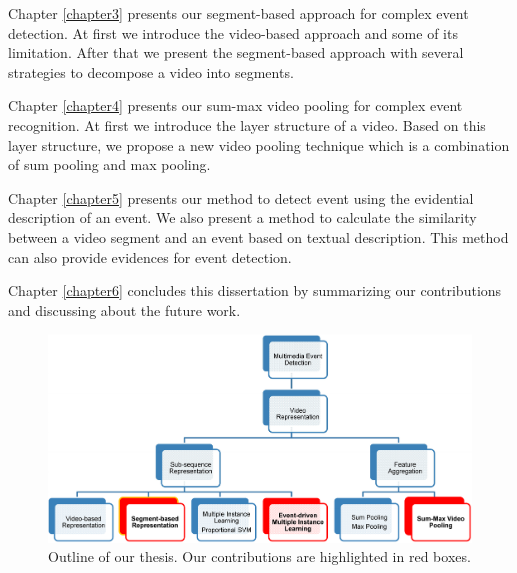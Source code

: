 Chapter \ref{chapter3} presents our segment-based approach for complex event detection. At first we introduce the video-based approach and some of its limitation. After that we present the segment-based approach with several strategies to decompose a video into segments.

Chapter \ref{chapter4} presents our sum-max video pooling for complex event recognition. At first we introduce the layer structure of a video. Based on this layer structure, we propose a new video pooling technique which is a combination of sum pooling and max pooling.

Chapter \ref{chapter5} presents our method to detect event using the evidential description of an event. We also present a method to calculate the similarity between a video segment and an event based on textual description. This method can also provide evidences for event detection.

Chapter \ref{chapter6} concludes this dissertation by summarizing our contributions and discussing about the future work.

	\begin{figure}
		\centering
		\includegraphics[width=1\textwidth]{outline.pdf}
		\caption{Outline of our thesis. Our contributions are highlighted in red boxes.}
		\label{c1_outline}
	\end{figure}
	
